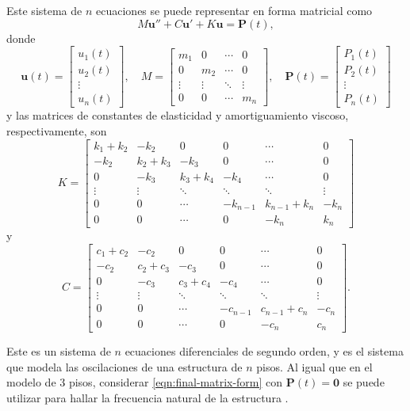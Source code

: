 Este sistema de \(n\) ecuaciones se puede representar en forma matricial como
\begin{equation}\label{eqn:final-matrix-form}
    M\mathbf{u}'' + C\mathbf{u}' + K\mathbf{u} = \mathbf{P}(t)
,\end{equation}
donde
\begin{equation}
    \mathbf{u}(t) = \begin{bmatrix} u_1(t) \\ u_2(t) \\ \vdots \\ u_n(t) \end{bmatrix},
    \quad
    M = \begin{bmatrix}
        m_1 & 0 & \cdots & 0 \\
        0 & m_2 & \cdots & 0 \\
        \vdots & \vdots & \ddots & \vdots \\
        0 & 0 & \cdots & m_n
    \end{bmatrix},
    \quad
    \mathbf{P}(t) = \begin{bmatrix} P_1(t) \\ P_2(t) \\ \vdots \\ P_n(t) \end{bmatrix}
\end{equation}
y las matrices de constantes de elasticidad y amortiguamiento viscoso, respectivamente, son
\begin{equation}
    K = \begin{bmatrix}
        k_1 + k_2 & -k_2 & 0 & 0 & \cdots & 0 \\
        -k_2 & k_2 + k_3 & -k_3 & 0 & \cdots & 0 \\
        0 & -k_3 & k_3 + k_4 & -k_4 & \cdots & 0 \\
        \vdots & \vdots & \ddots & \ddots & \ddots & \vdots \\
        0 & 0 & \cdots & -k_{n-1} & k_{n-1} + k_n & -k_n \\
        0 & 0 & \cdots & 0 & -k_{n} & k_n
    \end{bmatrix}
\end{equation}
y
\begin{equation}
    C = \begin{bmatrix}
        c_1 + c_2 & -c_2 & 0 & 0 & \cdots & 0 \\
        -c_2 & c_2 + c_3 & -c_3 & 0 & \cdots & 0 \\
        0 & -c_3 & c_3 + c_4 & -c_4 & \cdots & 0 \\
        \vdots & \vdots & \ddots & \ddots & \ddots & \vdots \\
        0 & 0 & \cdots & -c_{n-1} & c_{n-1} + c_n & -c_n \\
        0 & 0 & \cdots & 0 & -c_{n} & c_n
    \end{bmatrix}
.\end{equation}

Este es un sistema de \(n\) ecuaciones diferenciales de segundo orden, y es el sistema que modela las oscilaciones de una estructura de \(n\) pisos. Al igual que en el modelo de 3 pisos, considerar \eqref{eqn:final-matrix-form} con \(\mathbf{P}(t) = \mathbf{0}\) se puede utilizar para hallar la frecuencia natural de la estructura \citep{rendon}.

